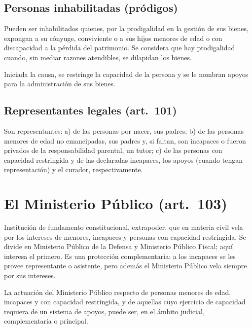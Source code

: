\documentclass[12pt,oneside]{book}
\begin{document}
\subsection{Personas inhabilitadas (pródigos)}

\begin{regla}
Pueden ser inhabilitados quienes, por la prodigalidad en la gestión de sus bienes, expongan a su cónyuge, conviviente o a sus hijos menores de edad o con discapacidad a la pérdida del patrimonio. Se considera que hay prodigalidad cuando, sin mediar razones atendibles, se dilapidan los bienes.
\end{regla}

Iniciada la causa, se restringe la capacidad de la persona y se le nombran apoyos para la administración de sus bienes.

\subsection{Representantes legales (art.~101)}

\begin{regla}
Son representantes: a) de las personas por nacer, sus padres; b) de las personas menores de edad no emancipadas, sus padres y, si faltan, son incapaces o fueron privados de la responsabilidad parental, un tutor; c) de las personas con capacidad restringida y de las declaradas incapaces, los apoyos (cuando tengan representación) y el curador, respectivamente.
\end{regla}

\section{El Ministerio Público (art.~103)}

Institución de fundamento constitucional, extrapoder, que en materia civil vela por los intereses de menores, incapaces y personas con capacidad restringida. Se divide en Ministerio Público de la Defensa y Ministerio Público Fiscal; aquí interesa el primero. Es una protección complementaria: a los incapaces se les provee representante o asistente, pero además el Ministerio Público vela siempre por sus intereses.

\begin{regla}
La actuación del Ministerio Público respecto de personas menores de edad, incapaces y con capacidad restringida, y de aquellas cuyo ejercicio de capacidad requiera de un sistema de apoyos, puede ser, en el ámbito judicial, complementaria o principal.
\end{regla}
\end{document}
